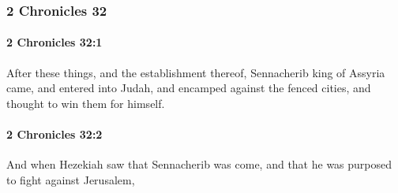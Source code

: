 	\subsubsection{2 Chronicles 32} %
		\label{2CHRONICLES-32}

		\paragraph{2 Chronicles 32:1} %
			\label{2CHRONICLES-32-1}

			After these things, and the establishment thereof, Sennacherib king of Assyria came, and entered into Judah, and encamped against the fenced cities, and thought to win them for himself.


		\paragraph{2 Chronicles 32:2} %
			\label{2CHRONICLES-32-2}

			And when Hezekiah saw that Sennacherib was come, and that he was purposed to fight against Jerusalem,

